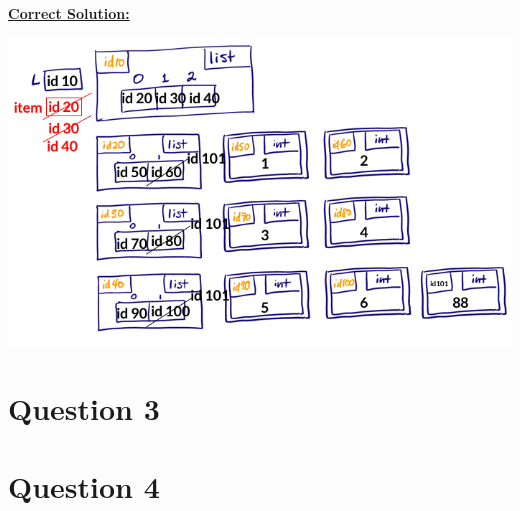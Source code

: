 \documentclass[12pt]{article}
\begin{document}
\begin{mdframed}
    \underline{\textbf{Correct Solution:}}

    \bigskip

    \begin{center}
    \includegraphics[width=0.8 \linewidth]{images/worksheet_1_review_q2_correction.png}
    \end{center}

\end{mdframed}


\section*{Question 3}

\section*{Question 4}
\end{document}
